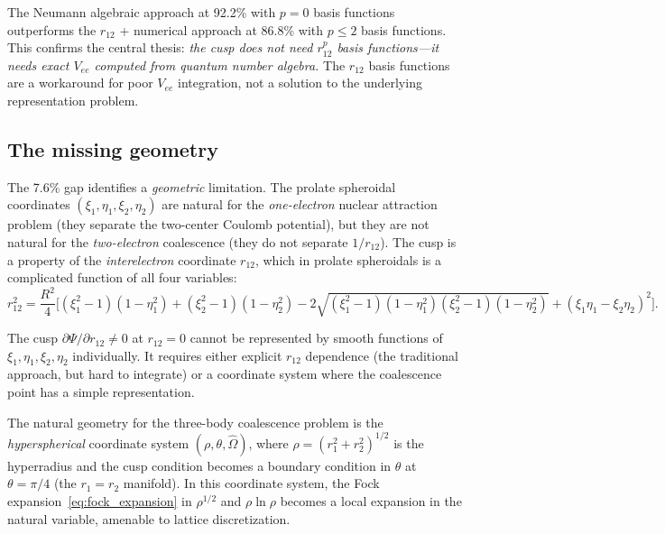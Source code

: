 \documentclass[aps,pra,twocolumn,superscriptaddress,longbibliography]{revtex4-2}
\begin{document}
The Neumann algebraic approach at 92.2\% with $p = 0$ basis
functions outperforms the $r_{12}$ + numerical approach at
86.8\% with $p \leq 2$ basis functions.  This confirms
the central thesis: \emph{the cusp does not need $r_{12}^p$
basis functions---it needs exact $V_{ee}$ computed from
quantum number algebra.}  The $r_{12}$ basis functions are
a workaround for poor $V_{ee}$ integration, not a solution
to the underlying representation problem.

\subsection{The missing geometry}

The 7.6\% gap identifies a \emph{geometric} limitation.  The
prolate spheroidal coordinates $(\xi_1, \eta_1, \xi_2, \eta_2)$
are natural for the \emph{one-electron} nuclear attraction
problem (they separate the two-center Coulomb potential), but
they are not natural for the \emph{two-electron} coalescence
(they do not separate $1/r_{12}$).  The cusp is a property
of the \emph{interelectron} coordinate $r_{12}$, which in
prolate spheroidals is a complicated function of all four
variables:
\begin{equation}
  r_{12}^2 = \frac{R^2}{4}\bigl[
    (\xi_1^2-1)(1-\eta_1^2) + (\xi_2^2-1)(1-\eta_2^2)
    - 2\sqrt{(\xi_1^2-1)(1-\eta_1^2)(\xi_2^2-1)(1-\eta_2^2)}
    + (\xi_1\eta_1 - \xi_2\eta_2)^2
  \bigr].
  \label{eq:r12_prolate}
\end{equation}

The cusp $\partial\Psi/\partial r_{12} \neq 0$ at $r_{12} = 0$
cannot be represented by smooth functions of $\xi_1, \eta_1,
\xi_2, \eta_2$ individually.  It requires either explicit
$r_{12}$ dependence (the traditional approach, but hard to
integrate) or a coordinate system where the coalescence point
has a simple representation.

The natural geometry for the three-body coalescence problem
is the \emph{hyperspherical} coordinate system
$(\rho, \theta, \hat{\Omega})$, where $\rho = (r_1^2 + r_2^2)^{1/2}$
is the hyperradius and the cusp condition becomes a boundary
condition in $\theta$ at $\theta = \pi/4$ (the $r_1 = r_2$
manifold).  In this coordinate system, the Fock
expansion~\eqref{eq:fock_expansion} in $\rho^{1/2}$ and
$\rho\ln\rho$ becomes a local expansion in the natural
variable, amenable to lattice discretization.

\end{document}
